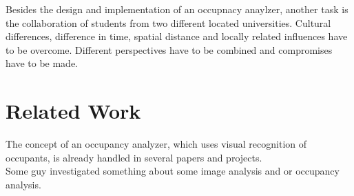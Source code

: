 Besides the design and implementation of an occupnacy anaylzer, another task is the collaboration of students from two different located universities. Cultural differences, difference in time, spatial distance and locally related influences have to be overcome. Different perspectives have to be combined and compromises have to be made.


\section{Related Work}


The concept of an occupancy analyzer, which uses visual recognition of occupants, is already handled in several papers and projects. \\
Some guy investigated something about some image analysis and or occupancy analysis. \\

